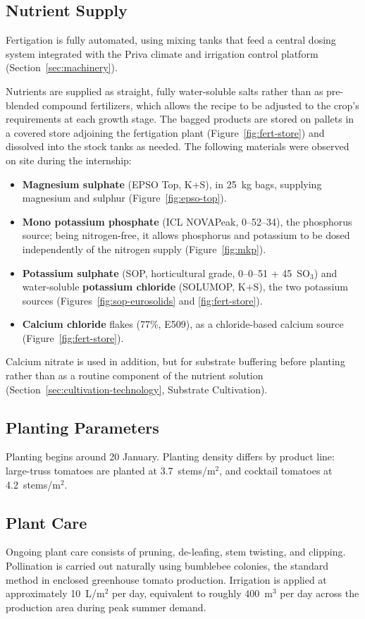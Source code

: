 \subsection{Nutrient Supply}
Fertigation is fully automated, using mixing tanks that feed a central dosing system integrated with the Priva climate and irrigation control platform (Section~\ref{sec:machinery}).

Nutrients are supplied as straight, fully water-soluble salts rather than as pre-blended compound fertilizers, which allows the recipe to be adjusted to the crop's requirements at each growth stage. The bagged products are stored on pallets in a covered store adjoining the fertigation plant (Figure~\ref{fig:fert-store}) and dissolved into the stock tanks as needed. The following materials were observed on site during the internship:
\begin{itemize}[nosep]
    \item \textbf{Magnesium sulphate} (EPSO Top, K+S), in 25~kg bags, supplying magnesium and sulphur (Figure~\ref{fig:epso-top}).
    \item \textbf{Mono potassium phosphate} (ICL NOVAPeak, 0--52--34), the phosphorus source; being nitrogen-free, it allows phosphorus and potassium to be dosed independently of the nitrogen supply (Figure~\ref{fig:mkp}).
    \item \textbf{Potassium sulphate} (SOP, horticultural grade, 0--0--51 + 45~SO$_3$) and water-soluble \textbf{potassium chloride} (SOLUMOP, K+S), the two potassium sources (Figures~\ref{fig:sop-eurosolids} and \ref{fig:fert-store}).
    \item \textbf{Calcium chloride} flakes (77\%, E509), as a chloride-based calcium source (Figure~\ref{fig:fert-store}).
\end{itemize}
Calcium nitrate is used in addition, but for substrate buffering before planting rather than as a routine component of the nutrient solution (Section~\ref{sec:cultivation-technology}, Substrate Cultivation). 

\subsection{Planting Parameters}
Planting begins around 20 January. Planting density differs by product line: large-truss tomatoes are planted at 3.7~stems/m$^2$, and cocktail tomatoes at 4.2~stems/m$^2$.

\subsection{Plant Care}
Ongoing plant care consists of pruning, de-leafing, stem twisting, and clipping. Pollination is carried out naturally using bumblebee colonies, the standard method in enclosed greenhouse tomato production. Irrigation is applied at approximately 10~L/m$^2$ per day, equivalent to roughly 400~m$^3$ per day across the production area during peak summer demand.

